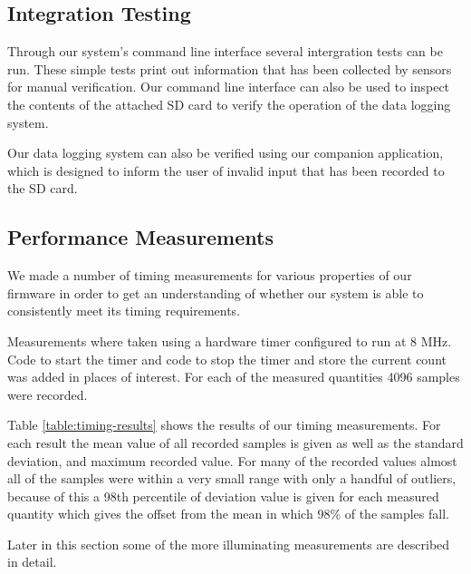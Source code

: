 \subsection{Integration Testing}

Through our system's command line interface several intergration tests can be
run. These simple tests print out information that has been collected by sensors
for manual verification. Our command line interface can also be used to inspect
the contents of the attached SD card to verify the operation of the data logging
system.

Our data logging system can also be verified using our companion application,
which is designed to inform the user of invalid input that has been recorded to
the SD card.

\subsection{Performance Measurements}

We made a number of timing measurements for various properties of our firmware
in order to get an understanding of whether our system is able to consistently
meet its timing requirements.

Measurements where taken using a hardware timer configured to run at 8 MHz. Code
to start the timer and code to stop the timer and store the current count was
added in places of interest. For each of the measured quantities 4096 samples
were recorded.

Table \ref{table:timing-results} shows the results of our timing measurements.
For each result the mean value of all recorded samples is given as well as the
standard deviation, and maximum recorded value. For many of the recorded values
almost all of the samples were within a very small range with only a handful
of outliers, because of this a 98th percentile of deviation value is given for
each measured quantity which gives the offset from the mean in which 98\% of the
samples fall.

Later in this section some of the more illuminating measurements are described
in detail.

